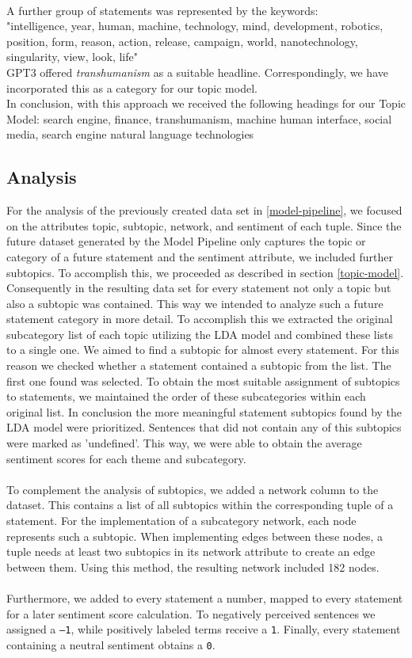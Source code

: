 \\
A further group of statements was represented by the keywords:
\\
"intelligence, year, human, machine, technology, mind, development, robotics, position, form, reason, action, release, campaign, world, nanotechnology, singularity, view, look, life"
\\
GPT3 offered \emph{transhumanism} as a suitable headline.
Correspondingly, we have incorporated this as a category for our topic model.
\\
In conclusion, with this approach we received the following headings for our Topic Model: search engine, finance, transhumanism, machine human interface, social media, search engine natural language technologies


\subsection{Analysis}
For the analysis of the previously created data set in \ref{model-pipeline}, we focused on the attributes topic, subtopic, network, and sentiment of each tuple. 
Since the future dataset generated by the Model Pipeline only captures the topic or category of a future statement and the sentiment attribute, we included further subtopics. 
To accomplish this, we proceeded as described in section \ref{topic-model}. 
Consequently in the resulting data set for every statement not only a topic but also a subtopic was contained.
This way we intended to analyze such a future statement category in more detail. 
To accomplish this we extracted the original subcategory list of each topic utilizing the LDA model and combined these lists to a single one. We aimed to find a subtopic for almost every statement. 
For this reason we checked whether a statement contained a subtopic from the list. 
The first one found was selected. 
To obtain the most suitable assignment of subtopics to statements, we maintained the order of these subcategories within each original list. 
In conclusion the more meaningful statement subtopics found by the LDA model were prioritized. Sentences that did not contain any of this subtopics were marked as 'undefined'. 
This way, we were able to obtain the average sentiment scores for each theme and subcategory.
\\
\\
To complement the analysis of subtopics, we added a network column to the dataset. 
This contains a list of all subtopics within the corresponding tuple of a statement. 
For the implementation of a subcategory network, each node represents such a subtopic. 
When implementing edges between these nodes, a tuple needs at least two subtopics in its network attribute to create an edge between them.
Using this method, the resulting network included 182 nodes.
\\
\\
Furthermore, we added to every statement a number, mapped to every statement for a later sentiment score calculation. To negatively perceived sentences we assigned a \texttt{–1}, while positively labeled terms receive a \texttt{1}. Finally, every statement containing a neutral sentiment obtains a \texttt{0}. 
